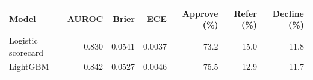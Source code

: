 \begin{tabular}{lrrrrrr}
\toprule
Model & AUROC & Brier & ECE & Approve (\%) & Refer (\%) & Decline (\%) \\
\midrule
Logistic scorecard & 0.830 & 0.0541 & 0.0037 & 73.2 & 15.0 & 11.8 \\
LightGBM & 0.842 & 0.0527 & 0.0046 & 75.5 & 12.9 & 11.7 \\
\bottomrule
\end{tabular}

